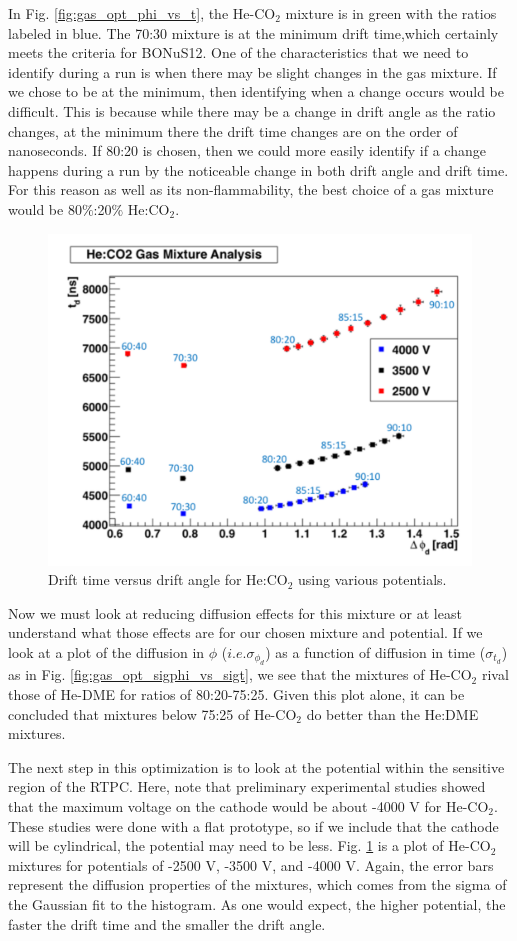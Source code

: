 In Fig. \ref{fig:gas_opt_phi_vs_t}, the He-CO$_2$ mixture is in green with the ratios labeled in blue. The 70:30 mixture is at the minimum drift time,which certainly meets the criteria for BONuS12. One of the characteristics that we need to identify during a run is when there may be slight changes in the gas mixture. If we chose to be at the minimum, then identifying when a change occurs would be difficult. This is because while there may be a change in drift angle as the ratio changes, at the minimum there the drift time changes are on the order of nanoseconds. If 80:20 is chosen, then we could more easily identify if a change happens during a run by the noticeable change in both drift angle and drift time. For this reason as well as its non-flammability, the best choice of a gas mixture would be 80$\%$:20$\%$ He:CO$_2$.

\begin{figure}[h!]
	\centering
	\includegraphics[width=0.8\linewidth]{figures/gas_opt_pot.png}
	\caption{Drift time versus drift angle for He:CO$_2$ using various potentials.}
	\label{fig:gas_opt_pot}
\end{figure}

Now we must look at reducing diffusion effects for this mixture or at least understand what those effects are for our chosen mixture and potential. If we look at a plot of the diffusion in $\phi$ ($i.e. \sigma_{\phi_{d}}$) as a function of diffusion in time ($\sigma_{t_{d}}$) as in Fig.
\ref{fig:gas_opt_sigphi_vs_sigt}, we see that the mixtures of He-CO$_2$ rival those of He-DME for ratios of 80:20-75:25. Given this plot alone, it can be concluded that mixtures below 75:25 of He-CO$_2$ do better than the He:DME mixtures.

The next step in this optimization is to look at the potential within the sensitive region of the RTPC. Here, note that preliminary experimental studies showed that the maximum voltage on the cathode would be about -4000 V for He-CO$_2$. These studies were done with a flat prototype, so if we include that the cathode will be cylindrical, the potential may need to be less. Fig. \ref{fig:gas_opt_pot} is a plot of He-CO$_2$ mixtures for potentials of -2500 V, -3500 V, and -4000 V. Again, the error bars represent the diffusion properties of the mixtures, which comes from the sigma of the Gaussian fit to the histogram. As one would expect, the higher potential, the faster the drift time and the smaller the drift angle.

